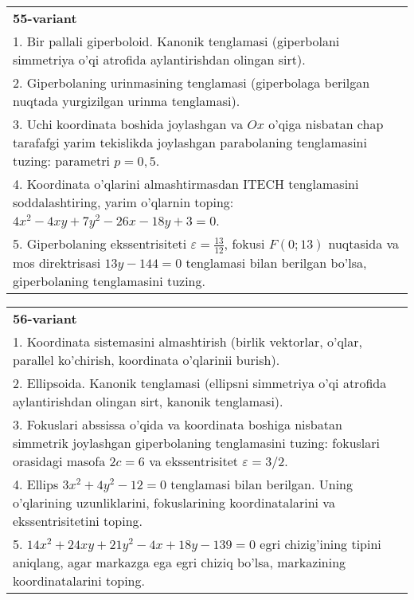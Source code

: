 \documentclass{article}
\begin{document}
\begin{tabular}{m{17cm}}
\textbf{55-variant}\\
1. Bir pallali giperboloid. Kanonik tenglamasi (giperbolani simmetriya o'qi atrofida aylantirishdan olingan sirt).\\

2. Giperbolaning urinmasining tenglamasi (giperbolaga berilgan nuqtada yurgizilgan urinma tenglamasi).\\

3. Uchi koordinata boshida joylashgan va $Ox$ o'qiga nisbatan chap tarafafgi yarim tekislikda joylashgan parabolaning tenglamasini tuzing: parametri $p=0,5$.\\

4. Koordinata o'qlarini almashtirmasdan ITECH tenglamasini soddalashtiring, yarim o'qlarnin toping: $4x^{2} - 4xy + 7y^{2} - 26x - 18y + 3 = 0$.\\

5. Giperbolaning ekssentrisiteti $\varepsilon = \frac{13}{12}$, fokusi $F(0;13)$ nuqtasida va mos direktrisasi $13y - 144 = 0$ tenglamasi bilan berilgan bo'lsa, giperbolaning tenglamasini tuzing.  
\end{tabular}
\vspace{1cm}


\begin{tabular}{m{17cm}}
\textbf{56-variant}\\
1. Koordinata sistemasini almashtirish (birlik vektorlar, o'qlar, parallel ko'chirish, koordinata o'qlarinii burish).\\

2. Ellipsoida. Kanonik tenglamasi (ellipsni simmetriya o'qi atrofida aylantirishdan olingan sirt, kanonik tenglamasi).\\

3. Fokuslari abssissa o'qida va koordinata boshiga nisbatan simmetrik joylashgan giperbolaning tenglamasini tuzing: fokuslari orasidagi masofa $2c=6$ va ekssentrisitet $\varepsilon=3/2$.\\

4. Ellips $3x^{2} + 4y^{2} - 12 = 0$ tenglamasi bilan berilgan. Uning o'qlarining uzunliklarini, fokuslarining koordinatalarini va ekssentrisitetini toping.  \\

5. $14x^{2} + 24xy + 21y^{2} - 4x + 18y - 139 = 0$ egri chizig'ining tipini aniqlang, agar markazga ega egri chiziq bo'lsa, markazining koordinatalarini toping.  
\end{tabular}
\vspace{1cm}
\end{document}
